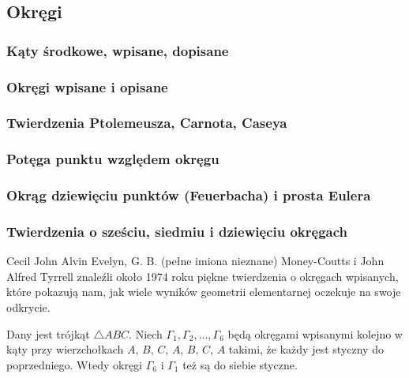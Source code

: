 \subsection{Okręgi}
\subsubsection{Kąty środkowe, wpisane, dopisane}


\subsubsection{Okręgi wpisane i opisane}


\subsubsection{Twierdzenia Ptolemeusza, Carnota, Caseya}


\subsubsection{Potęga punktu względem okręgu}


\subsubsection{Okrąg dziewięciu punktów (Feuerbacha) i prosta Eulera}


\subsubsection{Twierdzenia o sześciu, siedmiu i dziewięciu okręgach}
\label{sssection_6_7_9_circles}
Cecil John Alvin Evelyn, G. B. (pełne imiona nieznane) Money-Coutts i John Alfred Tyrrell znaleźli około 1974 roku piękne twierdzenia o okręgach wpisanych, które pokazują nam, jak wiele wyników geometrii elementarnej oczekuje na swoje odkrycie.

\begin{proposition}
	Dany jest trójkąt $\triangle ABC$.
	Niech $\Gamma_1, \Gamma_2, \ldots, \Gamma_6$ będą okręgami wpisanymi kolejno w kąty przy wierzchołkach $A$, $B$, $C$, $A$, $B$, $C$, $A$ takimi, że każdy jest styczny do poprzedniego.
	Wtedy okręgi $\Gamma_6$ i $\Gamma_1$ też są do siebie styczne.
\end{proposition}

